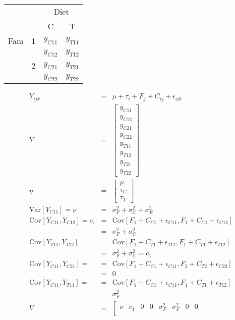 \documentclass[11pt]{article}
\begin{document}
\begin{tabular}{rr|cc|}
& & \multicolumn{2}{c}{Diet}\\
& & C & T \\
\hline
Fam & 1 & $y_{C11}$ & $y_{T11}$ \\
     &  & $y_{C12}$ & $y_{T12}$ \\
\hline
    & 2 & $y_{C21}$ & $y_{T21}$ \\
     &  & $y_{C22}$ & $y_{T22}$ \\
\hline
\end{tabular}
\begin{eqnarray}
 Y_{ijk} & = & \mu + \tau_i + F_j + C_{ij} + \epsilon_{ijk}\\
  Y & = & \left[\begin{array}{c} y_{C11} \\
  	y_{C12} \\
  	y_{C21} \\
  	y_{C22} \\
  	y_{T11} \\
  	y_{T12} \\
  	y_{T21} \\
  	y_{T22} \end{array}\right]\\
  \eta & = & \left[\begin{array}{c} \mu \\
  	\tau_C \\
  	\tau_T 
  	\end{array}\right]\\
  \mbox{Var}[Y_{C11}] = \nu & = & \sigma_{F}^2 + \sigma_{C}^2 + \sigma_{E}^2 \\
  \mbox{Cov}[Y_{C11},Y_{C12}] = c_1  & = & \mbox{Cov}[F_1 + C_{C1} + \epsilon_{C11},F_1 + C_{C1} + \epsilon_{C12}] \\
  & = & \sigma_{F}^2 + \sigma_{C}^2\\
  \mbox{Cov}[Y_{T11},Y_{T12}]  & = & \mbox{Cov}[F_1 + C_{T1} + \epsilon_{T11},F_1 + C_{T1} + \epsilon_{T12}] \\
  & = & \sigma_{F}^2 + \sigma_{C}^2 = c_1\\
  \mbox{Cov}[Y_{C11},Y_{C21}] = & = & \mbox{Cov}[F_1 + C_{C1} + \epsilon_{C11},F_2 + C_{T2} + \epsilon_{C22}] \\
  & = & 0\\
  \mbox{Cov}[Y_{C11},Y_{T11}]  = & = & \mbox{Cov}[F_1 + C_{C1} + \epsilon_{C11},F_1 + C_{T1} + \epsilon_{T12}] \\
  & = & \sigma_{F}^2\\
  V & = & \left[\begin{array}{cccccccc} \nu & c_1 & 0 & 0 & \sigma_{F}^2 & \sigma_{F}^2 & 0 & 0 \\ 

\end{array}
\end{eqnarray}
\end{document}
